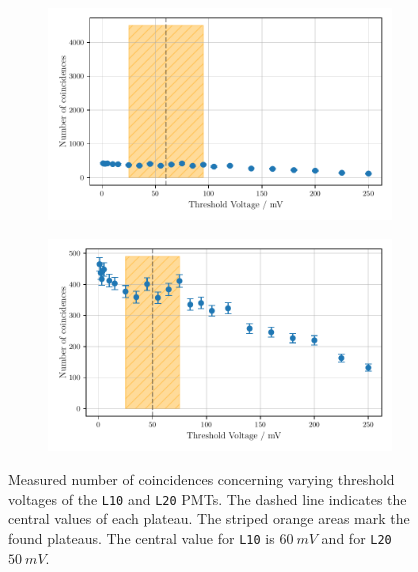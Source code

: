 \begin{figure}
    \centering
    \begin{subfigure}[b]{0.48\textwidth}
        \includegraphics[width=\textwidth]{plots/threshL10_2.pdf}
    \end{subfigure}\hfill
    \begin{subfigure}[b]{0.48\textwidth}
        \includegraphics[width=\textwidth]{plots/threshL20.pdf}
    \end{subfigure}
    \caption{Measured number of coincidences concerning varying threshold voltages
    of the \texttt{L10} and \texttt{L20} PMTs.
    The dashed line indicates the central values of each plateau. The striped orange areas mark the found plateaus.
    The central value for \texttt{L10} is $\SI{60}{mV}$ and for \texttt{L20} $\SI{50}{mV}$.}
    \label{fig:appthresh5}
\end{figure}
